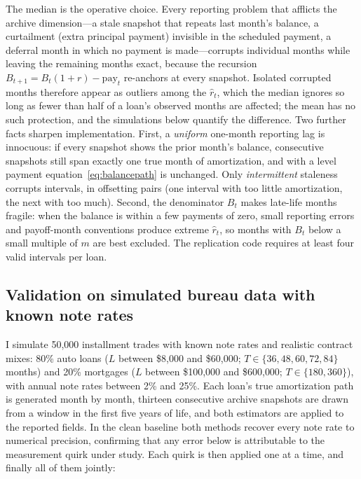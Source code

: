 The median is the operative choice. Every reporting problem that afflicts the archive dimension---a stale snapshot that repeats last month's balance, a curtailment (extra principal payment) invisible in the scheduled payment, a deferral month in which no payment is made---corrupts individual months while leaving the remaining months exact, because the recursion $B_{t+1} = B_t(1+r) - \mathrm{pay}_t$ re-anchors at every snapshot. Isolated corrupted months therefore appear as outliers among the $\hat r_t$, which the median ignores so long as fewer than half of a loan's observed months are affected; the mean has no such protection, and the simulations below quantify the difference. Two further facts sharpen implementation. First, a \emph{uniform} one-month reporting lag is innocuous: if every snapshot shows the prior month's balance, consecutive snapshots still span exactly one true month of amortization, and with a level payment equation~\eqref{eq:balancepath} is unchanged. Only \emph{intermittent} staleness corrupts intervals, in offsetting pairs (one interval with too little amortization, the next with too much). Second, the denominator $B_t$ makes late-life months fragile: when the balance is within a few payments of zero, small reporting errors and payoff-month conventions produce extreme $\hat r_t$, so months with $B_t$ below a small multiple of $m$ are best excluded. The replication code requires at least four valid intervals per loan.

\subsection{Validation on simulated bureau data with known note rates}\label{appendix:rateimputation:sim}

I simulate 50{,}000 installment trades with known note rates and realistic contract mixes: 80\% auto loans ($L$ between \$8{,}000 and \$60{,}000; $T \in \{36, 48, 60, 72, 84\}$ months) and 20\% mortgages ($L$ between \$100{,}000 and \$600{,}000; $T \in \{180, 360\}$), with annual note rates between 2\% and 25\%. Each loan's true amortization path is generated month by month, thirteen consecutive archive snapshots are drawn from a window in the first five years of life, and both estimators are applied to the reported fields. In the clean baseline both methods recover every note rate to numerical precision, confirming that any error below is attributable to the measurement quirk under study. Each quirk is then applied one at a time, and finally all of them jointly:

